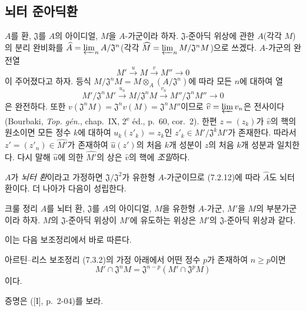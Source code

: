 \subsection{뇌터 준아딕환}
\label{subsection:0.7.3-ko}

\begin{env}[7.3.1]
\label{0.7.3.1-ko}
$A$를 환, $\mathfrak J$를 $A$의 아이디얼, $M$을 $A$-가군이라
하자. $\mathfrak J$-준아딕 위상에 관한 $A$(각각 $M$)의 분리
완비화를
$\widehat A=\varprojlim_n A/\mathfrak J^n$(각각
$\widehat M=\varprojlim_n M/\mathfrak J^nM$)으로 쓰겠다.
$A$-가군의 완전열
\[
  M'\xrightarrow{u}M\xrightarrow{v}M''\to0
\]
이 주어졌다고 하자. 등식
$M/\mathfrak J^nM=M\otimes_A(A/\mathfrak J^n)$에 따라 모든
$n$에 대하여 열
\[
  M'/\mathfrak J^nM'\xrightarrow{u_n}
  M/\mathfrak J^nM\xrightarrow{v_n}
  M''/\mathfrak J^nM''\to0
\]
은 완전하다. 또한
$v(\mathfrak J^nM)=\mathfrak J^nv(M)=\mathfrak J^nM''$이므로
$\widehat v=\varprojlim v_n$은 전사이다(Bourbaki,
\emph{Top. gén.}, chap.~IX, 2\textsuperscript{e} éd., p.~60,
cor.~2). 한편 $z=(z_k)$가 $\widehat v$의 핵의 원소이면 모든 정수
$k$에 대하여 $u_k(z'_k)=z_k$인
$z'_k\in M'/\mathfrak J^kM'$가 존재한다. 따라서
$z'=(z'_n)\in\widehat{M'}$가 존재하여 $\widehat u(z')$의 처음
$k$개 성분이 $z$의 처음 $k$개 성분과 일치한다. 다시 말해
$\widehat u$에 의한 $\widehat{M'}$의 상은 $\widehat v$의 핵에
\emph{조밀}하다.

$A$가 \emph{뇌터 환}이라고 가정하면
$\mathfrak J/\mathfrak J^2$가 유한형 $A$-가군이므로 (7.2.12)에
따라 $\widehat A$도 뇌터 환이다. 더 나아가 다음이 성립한다.
\end{env}

\begin{namedtheorem}[7.3.2]{크룰 정리}
\label{0.7.3.2-ko}
$A$를 뇌터 환, $\mathfrak J$를 $A$의 아이디얼, $M$을 유한형
$A$-가군, $M'$을 $M$의 부분가군이라 하자. $M$의
$\mathfrak J$-준아딕 위상이 $M'$에 유도하는 위상은 $M'$의
$\mathfrak J$-준아딕 위상과 같다.
\end{namedtheorem}

이는 다음 보조정리에서 바로 따른다.

\begin{namedlemma}[7.3.2.1]{아르틴--리스 보조정리}
\label{0.7.3.2.1-ko}
(7.3.2)의 가정 아래에서 어떤 정수 $p$가 존재하여 $n\geq p$이면
\[
  M'\cap\mathfrak J^nM=\mathfrak J^{n-p}
  (M'\cap\mathfrak J^pM)
\]
이다.
\end{namedlemma}

증명은 ([I], p.~2-04)를 보라.


